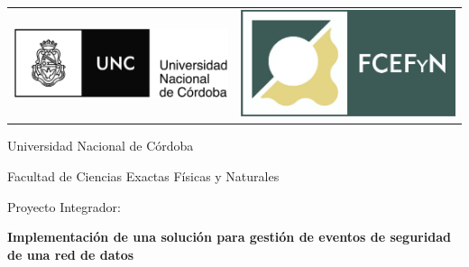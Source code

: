 \begin{titlepage}

    \begin{center}

        \begin{tabular}{ p{} p{} }
        		\centering\includegraphics[height=0.15\textwidth]{./imagenes_caratula/unc_logo.jpg} &
        		\centering\includegraphics[height=0.15\textwidth]{./imagenes_caratula/logo_fcefyn_nuevo.jpg}
        \end{tabular}
        
        \vspace*{30mm}
        \begin{Huge}
            Universidad Nacional de Córdoba \\
        \end{Huge}
        
        \vspace*{10mm}
        \begin{Large}
            Facultad de Ciencias Exactas Físicas y Naturales \\
        \end{Large}
        
        \vspace*{20mm}
        \begin{large}
            Proyecto Integrador: \\
        \end{large}
        
        \vspace*{5mm}
        \begin{LARGE}
            \textbf{Implementación de una solución para gestión de eventos de seguridad de una red de datos} \\
        \end{LARGE}
        

\end{center}
\end{titlepage}
